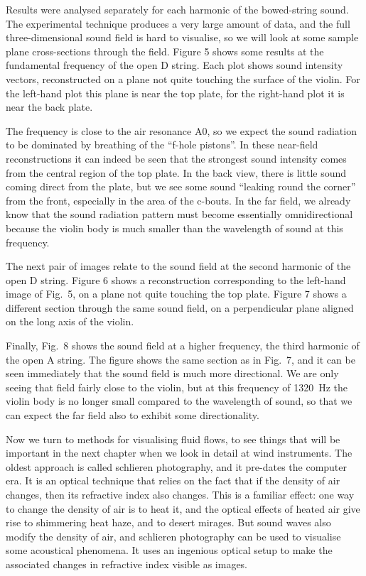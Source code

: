   Results were analysed separately for each harmonic of the bowed-string sound. 
  The experimental technique produces a very large amount of data, and the full 
  three-dimensional sound field is hard to visualise, so we will look at some 
  sample plane cross-sections through the field. Figure 5 shows some results at 
  the fundamental frequency of the open D string. Each plot shows sound 
  intensity vectors, reconstructed on a plane not quite touching the surface of 
  the violin. For the left-hand plot this plane is near the top plate, for the 
  right-hand plot it is near the back plate. 

  The frequency is close to the air resonance A0, so we expect the sound 
  radiation to be dominated by breathing of the “f-hole pistons”. In these 
  near-field reconstructions it can indeed be seen that the strongest sound 
  intensity comes from the central region of the top plate. In the back view, 
  there is little sound coming direct from the plate, but we see some sound 
  “leaking round the corner” from the front, especially in the area of the 
  c-bouts. In the far field, we already know that the sound radiation pattern 
  must become essentially omnidirectional because the violin body is much 
  smaller than the wavelength of sound at this frequency. 

  The next pair of images relate to the sound field at the second harmonic of 
  the open D string. Figure 6 shows a reconstruction corresponding to the 
  left-hand image of Fig.\ 5, on a plane not quite touching the top plate. 
  Figure 7 shows a different section through the same sound field, on a 
  perpendicular plane aligned on the long axis of the violin. 

  Finally, Fig.\ 8 shows the sound field at a higher frequency, the third 
  harmonic of the open A string. The figure shows the same section as in Fig.\ 
  7, and it can be seen immediately that the sound field is much more 
  directional. We are only seeing that field fairly close to the violin, but at 
  this frequency of 1320~Hz the violin body is no longer small compared to the 
  wavelength of sound, so that we can expect the far field also to exhibit some 
  directionality. 

  Now we turn to methods for visualising fluid flows, to see things that will 
  be important in the next chapter when we look in detail at wind instruments. 
  The oldest approach is called schlieren photography, and it pre-dates the 
  computer era. It is an optical technique that relies on the fact that if the 
  density of air changes, then its refractive index also changes. This is a 
  familiar effect: one way to change the density of air is to heat it, and the 
  optical effects of heated air give rise to shimmering heat haze, and to 
  desert mirages. But sound waves also modify the density of air, and schlieren 
  photography can be used to visualise some acoustical phenomena. It uses an 
  ingenious optical setup to make the associated changes in refractive index 
  visible as images. 

